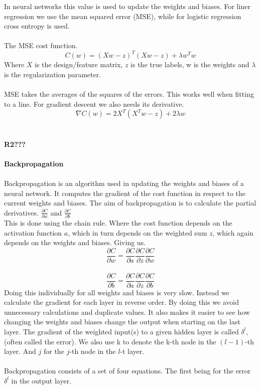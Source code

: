 \documentclass[12pt, letterpaper, twoside]{article}
\begin{document}
In neural networks this value is used to update the weights and biases. For liner regression we use the mean squared error (MSE), while for logistic regression cross entropy is used.\\
\ \\
The MSE cost function.
$$
C(w) = (Xw - z)^T(Xw - z) + \lambda w^T w
$$
Where $X$ is the design/feature matrix, $z$ is the true labels, w is the weights and $\lambda$ is the regularization parameter.\\
\ \\
MSE takes the averages of the squares of the errors. This works well when fitting to a line. For gradient descent we also needs its derivative.
$$
\nabla C(w) = 2 X^T (X^T w - z) + 2 \lambda w
$$
\ \\
\ \\
\textbf{R2???}\\
\ \\
\textbf{Backpropagation}\\
\ \\
Backpropagation is an algorithm used in updating the weights and biases of a neural network. It computes the gradient of the cost function in respect to the current weights and biases. The aim of backpropagation is to calculate the partial derivatives.
$\frac{\partial C}{\partial w}$ and $\frac{\partial C}{\partial b}$\\
This is done using the chain rule. Where the cost function depends on the activation function $a$, which in turn depends on the weighted sum $z$, which again depends on the weights and biases. Giving us.\\
$$
\frac{\partial C}{\partial w} = \frac{\partial C}{\partial a}\frac{\partial C}{\partial z}\frac{\partial C}{\partial w}
$$
\ \\
$$
\frac{\partial C}{\partial b} = \frac{\partial C}{\partial a}\frac{\partial C}{\partial z}\frac{\partial C}{\partial b}
$$
Doing this individually for all weights and biases is very slow. Instead we calculate the gradient for each layer in reverse order. By doing this we avoid unnecessary calculations and duplicate values. It also makes it easier to see how changing the weights and biases change the output when starting on the last layer. The gradient of the weighted input(s) to a given hidden layer is called $\delta^l$, (often called the error). We also use k to denote the k-th node in the $(l-1)$-th layer. And $j$ for the $j$-th node in the $l$-t layer.\\
\ \\
Backpropagation consists of a set of four equations. The first being for the error $\delta^l$ in the output layer.\\
\end{document}

